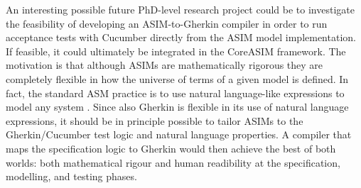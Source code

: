 An interesting possible future PhD-level research project could be to investigate the feasibility of developing an ASIM-to-Gherkin compiler in order to run acceptance tests with Cucumber directly from the ASIM model implementation. If feasible, it could ultimately be integrated in the CoreASIM framework. The motivation is that although ASIMs are mathematically rigorous they are completely flexible in how the universe of terms of a given model is defined. In fact, the standard ASM practice is to use natural language-like expressions to model any system \cite{BoergerStaerk2003,BoergerRaschke2018}. Since also Gherkin is flexible in its use of natural language expressions, it should be in principle possible to tailor ASIMs to the Gherkin/Cucumber test logic and natural language properties. A compiler that maps the specification logic to Gherkin would then achieve the best of both worlds: both mathematical rigour and human readibility at the specification, modelling, and testing phases.

\newpage
